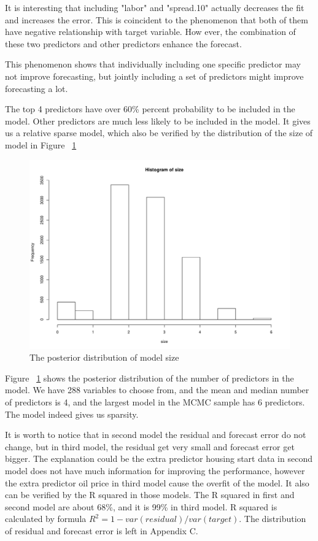 It is interesting that including "labor" and "spread.10" actually decreases the fit and increases the error. This is coincident to the phenomenon that both of them have negative relationship with target variable. How ever, the combination of these two predictors and other predictors enhance the forecast. 

This phenomenon shows that individually including one specific predictor may not improve forecasting, but jointly including a set of predictors might improve forecasting a lot. 





The top 4 predictors have over 60\% percent probability to be included in the model. Other predictors are much less likely to be included in the model. It gives us a relative sparse model, which also be verified by the distribution of the size of model in Figure ~\ref{fig:size} 

\begin{figure}[h]
	\centering
	\includegraphics[width=0.5\linewidth]{Figures/size}
	\caption{The posterior distribution of  model size}
	\label{fig:size}
\end{figure}

Figure ~\ref{fig:size} shows the posterior distribution of the number of predictors in the model. We have 288 variables to choose from, and the mean and median number of predictors is 4, and the largest model in the MCMC sample has 6 predictors. The model indeed gives us sparsity.  




It is worth to notice that in second model the residual and forecast error do not change, but in third model, the residual get very small and forecast error get bigger. The explanation could be the extra predictor housing start data in second model does not have much information for improving the performance, however the extra predictor oil price in third model cause the overfit of the model. It also can be verified by the R squared in those models. The R squared in first and second model are about 68\%, and it is 99\% in third model. R squared is calculated by formula $ R^2 = 1- var(residual)/var(target)$. The distribution of residual and forecast error is left in Appendix C.



